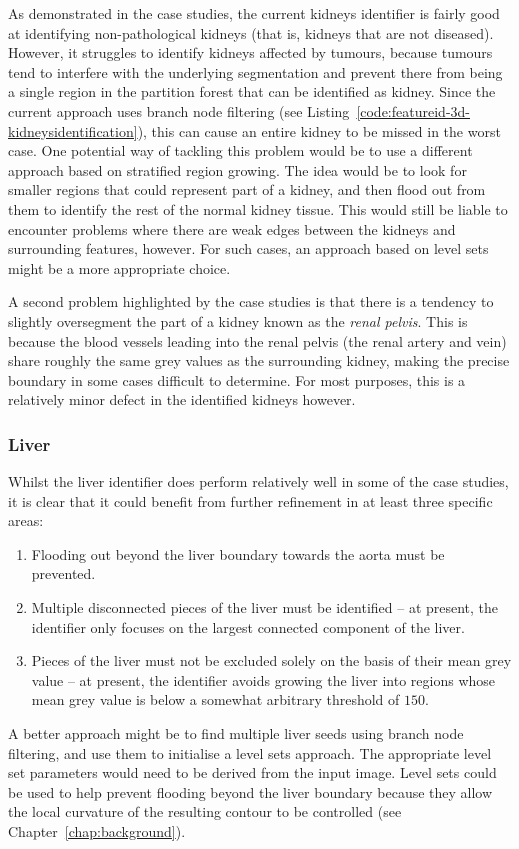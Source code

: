 As demonstrated in the case studies, the current kidneys identifier is fairly good at identifying non-pathological kidneys (that is, kidneys that are not diseased). However, it struggles to identify kidneys affected by tumours, because tumours tend to interfere with the underlying segmentation and prevent there from being a single region in the partition forest that can be identified as kidney. Since the current approach uses branch node filtering (see Listing~\ref{code:featureid-3d-kidneysidentification}), this can cause an entire kidney to be missed in the worst case. One potential way of tackling this problem would be to use a different approach based on stratified region growing. The idea would be to look for smaller regions that could represent part of a kidney, and then flood out from them to identify the rest of the normal kidney tissue. This would still be liable to encounter problems where there are weak edges between the kidneys and surrounding features, however. For such cases, an approach based on level sets might be a more appropriate choice.

A second problem highlighted by the case studies is that there is a tendency to slightly oversegment the part of a kidney known as the \emph{renal pelvis}. This is because the blood vessels leading into the renal pelvis (the renal artery and vein) share roughly the same grey values as the surrounding kidney, making the precise boundary in some cases difficult to determine. For most purposes, this is a relatively minor defect in the identified kidneys however.

\subsubsection{Liver}

Whilst the liver identifier does perform relatively well in some of the case studies, it is clear that it could benefit from further refinement in at least three specific areas:
%
\begin{enumerate}

\item Flooding out beyond the liver boundary towards the aorta must be prevented.
\item Multiple disconnected pieces of the liver must be identified -- at present, the identifier only focuses on the largest connected component of the liver.
\item Pieces of the liver must not be excluded solely on the basis of their mean grey value -- at present, the identifier avoids growing the liver into regions whose mean grey value is below a somewhat arbitrary threshold of $150$.

\end{enumerate}
%
A better approach might be to find multiple liver seeds using branch node filtering, and use them to initialise a level sets approach. The appropriate level set parameters would need to be derived from the input image. Level sets could be used to help prevent flooding beyond the liver boundary because they allow the local curvature of the resulting contour to be controlled (see Chapter~\ref{chap:background}).

